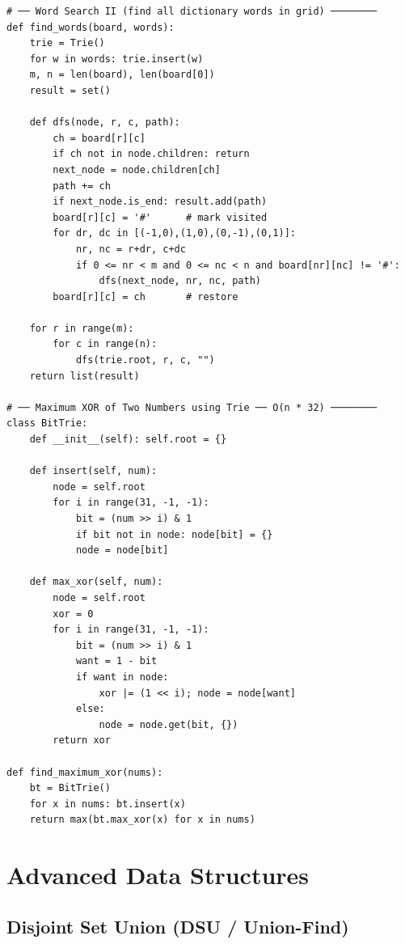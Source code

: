 \documentclass[11pt,a4paper]{report}
\begin{document}
\begin{lstlisting}
# ── Word Search II (find all dictionary words in grid) ────────
def find_words(board, words):
    trie = Trie()
    for w in words: trie.insert(w)
    m, n = len(board), len(board[0])
    result = set()

    def dfs(node, r, c, path):
        ch = board[r][c]
        if ch not in node.children: return
        next_node = node.children[ch]
        path += ch
        if next_node.is_end: result.add(path)
        board[r][c] = '#'      # mark visited
        for dr, dc in [(-1,0),(1,0),(0,-1),(0,1)]:
            nr, nc = r+dr, c+dc
            if 0 <= nr < m and 0 <= nc < n and board[nr][nc] != '#':
                dfs(next_node, nr, nc, path)
        board[r][c] = ch       # restore

    for r in range(m):
        for c in range(n):
            dfs(trie.root, r, c, "")
    return list(result)

# ── Maximum XOR of Two Numbers using Trie ── O(n * 32) ────────
class BitTrie:
    def __init__(self): self.root = {}

    def insert(self, num):
        node = self.root
        for i in range(31, -1, -1):
            bit = (num >> i) & 1
            if bit not in node: node[bit] = {}
            node = node[bit]

    def max_xor(self, num):
        node = self.root
        xor = 0
        for i in range(31, -1, -1):
            bit = (num >> i) & 1
            want = 1 - bit
            if want in node:
                xor |= (1 << i); node = node[want]
            else:
                node = node.get(bit, {})
        return xor

def find_maximum_xor(nums):
    bt = BitTrie()
    for x in nums: bt.insert(x)
    return max(bt.max_xor(x) for x in nums)
\end{lstlisting}


\part{Advanced Data Structures}

\chapter{Disjoint Set Union (DSU / Union-Find)}
\end{document}
